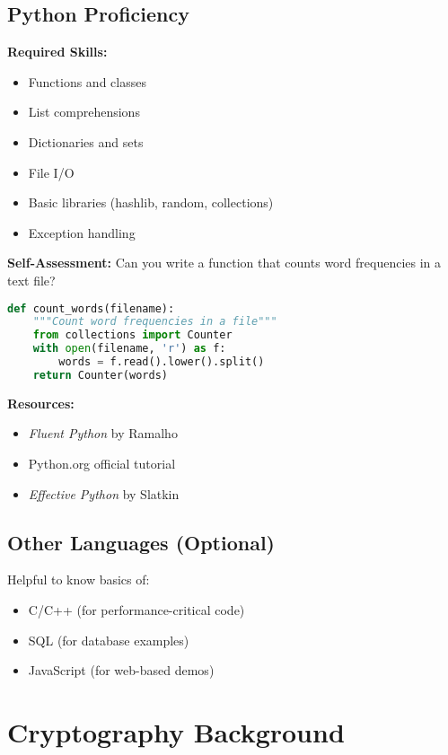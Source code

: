 \subsection{Python Proficiency}

\textbf{Required Skills:}
\begin{itemize}
\item Functions and classes
\item List comprehensions
\item Dictionaries and sets
\item File I/O
\item Basic libraries (hashlib, random, collections)
\item Exception handling
\end{itemize}

\textbf{Self-Assessment:}
Can you write a function that counts word frequencies in a text file?

\begin{lstlisting}[language=Python]
def count_words(filename):
    """Count word frequencies in a file"""
    from collections import Counter
    with open(filename, 'r') as f:
        words = f.read().lower().split()
    return Counter(words)
\end{lstlisting}

\textbf{Resources:}
\begin{itemize}
\item \textit{Fluent Python} by Ramalho
\item Python.org official tutorial
\item \textit{Effective Python} by Slatkin
\end{itemize}

\subsection{Other Languages (Optional)}

Helpful to know basics of:
\begin{itemize}
\item C/C++ (for performance-critical code)
\item SQL (for database examples)
\item JavaScript (for web-based demos)
\end{itemize}

\section{Cryptography Background}

